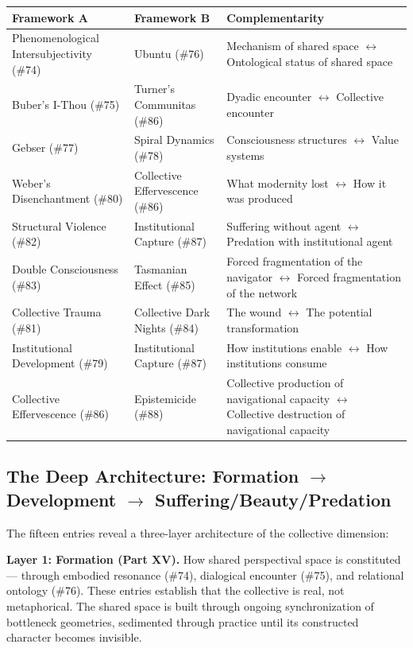 \begin{longtable}{p{} p{} p{}}
\toprule
\textbf{Framework A} & \textbf{Framework B} & \textbf{Complementarity} \\
\midrule
\endhead
Phenomenological Intersubjectivity (\#74) & Ubuntu (\#76) & Mechanism of shared space $\leftrightarrow$ Ontological status of shared space \\
Buber's I-Thou (\#75) & Turner's Communitas (\#86) & Dyadic encounter $\leftrightarrow$ Collective encounter \\
Gebser (\#77) & Spiral Dynamics (\#78) & Consciousness structures $\leftrightarrow$ Value systems \\
Weber's Disenchantment (\#80) & Collective Effervescence (\#86) & What modernity lost $\leftrightarrow$ How it was produced \\
Structural Violence (\#82) & Institutional Capture (\#87) & Suffering without agent $\leftrightarrow$ Predation with institutional agent \\
Double Consciousness (\#83) & Tasmanian Effect (\#85) & Forced fragmentation of the navigator $\leftrightarrow$ Forced fragmentation of the network \\
Collective Trauma (\#81) & Collective Dark Nights (\#84) & The wound $\leftrightarrow$ The potential transformation \\
Institutional Development (\#79) & Institutional Capture (\#87) & How institutions enable $\leftrightarrow$ How institutions consume \\
Collective Effervescence (\#86) & Epistemicide (\#88) & Collective production of navigational capacity $\leftrightarrow$ Collective destruction of navigational capacity \\
\bottomrule
\end{longtable}



\subsection*{The Deep Architecture: Formation $\rightarrow$ Development $\rightarrow$ Suffering/Beauty/Predation}


The fifteen entries reveal a three-layer architecture of the collective dimension:


\textbf{Layer 1: Formation (Part XV).} How shared perspectival space is constituted — through embodied resonance (\#74), dialogical encounter (\#75), and relational ontology (\#76). These entries establish that the collective is real, not metaphorical. The shared space is built through ongoing synchronization of bottleneck geometries, sedimented through practice until its constructed character becomes invisible.


